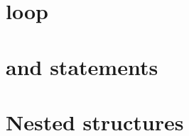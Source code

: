 \begin{sloppypar}
 \section{{} loop}

 \section{{} and {} statements}

 \section{Nested structures}




\end{sloppypar}
